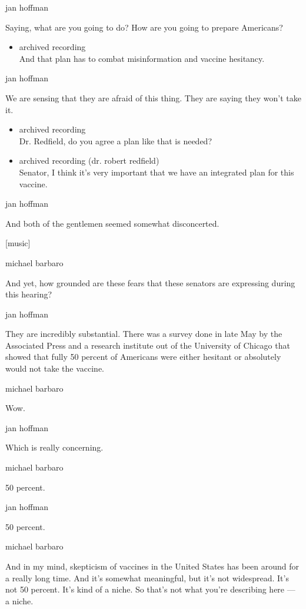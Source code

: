 jan hoffman

Saying, what are you going to do? How are you going to prepare
Americans?

\begin{itemize}
\tightlist
\item
  archived recording\\
  And that plan has to combat misinformation and vaccine hesitancy.
\end{itemize}

jan hoffman

We are sensing that they are afraid of this thing. They are saying they
won't take it.

\begin{itemize}
\item
  archived recording\\
  Dr. Redfield, do you agree a plan like that is needed?
\item
  archived recording (dr. robert redfield)\\
  Senator, I think it's very important that we have an integrated plan
  for this vaccine.
\end{itemize}

jan hoffman

And both of the gentlemen seemed somewhat disconcerted.

{[}music{]}

michael barbaro

And yet, how grounded are these fears that these senators are expressing
during this hearing?

jan hoffman

They are incredibly substantial. There was a survey done in late May by
the Associated Press and a research institute out of the University of
Chicago that showed that fully 50 percent of Americans were either
hesitant or absolutely would not take the vaccine.

michael barbaro

Wow.

jan hoffman

Which is really concerning.

michael barbaro

50 percent.

jan hoffman

50 percent.

michael barbaro

And in my mind, skepticism of vaccines in the United States has been
around for a really long time. And it's somewhat meaningful, but it's
not widespread. It's not 50 percent. It's kind of a niche. So that's not
what you're describing here --- a niche.

